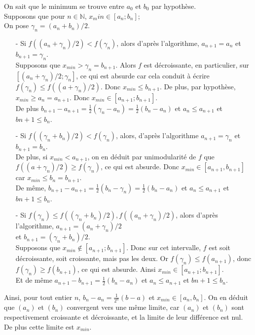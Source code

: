 \documentclass[12pt,a4paper]{article}
\begin{document}
On sait que le minimum se trouve entre $a_0$ et $b_0$ par hypothèse.\\
Supposons que pour $n \in \mathbb{N}$, $x_min \in [a_n;b_n]$;\\
On pose $\gamma_n = (a_n+b_n)/2$.\\
\begin{enumerate}
	\item[-] Si $f((a_n+\gamma_n)/2) < f(\gamma_n)$, alors d'après l'algorithme, $a_{n+1}=a_n$ et $b_{n+1}=\gamma_n$.\\
	Supposons que $x_{min} > \gamma_n=b_{n+1}$. Alors $f$ est décroissante, en particulier, sur $[(a_n+\gamma_n)/2;\gamma_n]$, ce qui est absurde car cela conduit à écrire $f(\gamma_n)\leq f((a+\gamma_n)/2)$. Donc $x_{min} \leq b_{n+1}$. De plus, par hypothèse, $x_{min}\geq a_n=a_{n+1}$. Donc $x_{min} \in [a_{n+1};b_{n+1}]$.\\
	De plus $b_{n+1}-a_{n+1} =  \frac{1}{2}(\gamma_n-a_n) = \frac{1}{2}(b_n-a_n)$ et $a_n \leq a_{n+1}$ et $b{n+1}\leq b_n$.
	
	\item[-] Si $f((\gamma_n+b_n)/2)<f(\gamma_n)$, alors, d'après l'algorithme $a_{n+1} = \gamma_n$ et $b_{n+1}=b_n$.\\ De plus, si $x_{min} < a_{n+1}$, on en déduit par unimodularité de $f$ que $f((a+\gamma_n)/2) \geq f(\gamma_n)$, ce qui est absurde. Donc $x_{min} \in [a_{n+1},b_{n+1}]$ car $x_{min} \leq b_n=b_{n+1}$.\\
	De même, $b_{n+1}-a_{n+1} = \frac{1}{2}(b_n-\gamma_n)=\frac{1}{2}(b_n-a_n)$ et $a_n \leq a_{n+1}$ et $b{n+1}\leq b_n$.
	
	\item[-] Si $f(\gamma_n)\leq f((\gamma_n+b_n)/2), f((a_n+\gamma_n)/2)$, alors d'après l'algorithme, $a_{n+1}=(a_n+\gamma_n)/2$ \\ et $b_{n+1}=(\gamma_n+b_n)/2$.\\
	Supposons que $x_{min} \not \in [a_{n+1};b_{n+1}]$. Donc sur cet intervalle, $f$ est soit décroissante, soit croissante, mais pas les deux. Or $f(\gamma_n) \leq f(a_{n+1})$, donc $f(\gamma_n) \geq f(b_{n+1})$, ce qui est absurde. Ainsi $x_{min}\in[a_{n+1};b_{n+1}]$.\\
	Et de même $a_{n+1}-b_{n+1}=\frac{1}{2}(b_n-a_n)$ et $a_n \leq a_{n+1}$ et $b{n+1}\leq b_n$.
\end{enumerate}

Ainsi, pour tout entier $n$, $b_n - a_n = \frac{1}{2^n}(b-a)$ et $x_{min}\in [a_n,b_n]$. On en déduit que $(a_n)$ et $(b_n)$ convergent vers une même limite, car $(a_n)$ et $(b_n)$ sont respectivement croissante et décroissante, et la limite de leur différence est nul. De plus cette limite est $x_{min}$.\\
\end{document}
